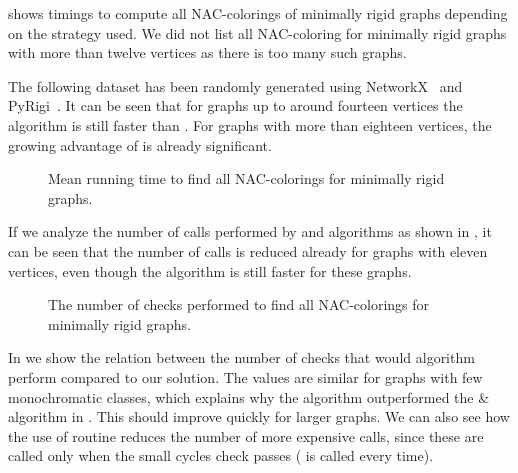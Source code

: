 shows timings to compute all NAC-colorings of minimally rigid graphs
depending on the strategy used.
We did not list all NAC-coloring for minimally rigid graphs with more than twelve vertices
as there is too many such graphs.

The following dataset has been randomly generated
using NetworkX~\cite{networkx} and PyRigi~\cite{pyrigi}.
%
It can be seen that for graphs up to around fourteen vertices the \NaiveCycles{} algorithm
is still faster than \Subgraphs{}.
For graphs with more than eighteen vertices,
the growing advantage of \Subgraphs{} is already significant.

\begin{figure}[ht]
	\centering
	\scalebox{0.5}{}
	\caption[Running time for minimally rigid graphs.]{
		Mean running time to find all NAC-colorings for minimally rigid graphs.}%
	\label{fig:graph_time_minimally_rigid}
\end{figure}%

If we analyze the number of \IsNACColoring{} calls performed by \NaiveCycles{} and \Subgraphs{} algorithms
as shown in ,
it can be seen that the number of \IsNACColoring{} calls is reduced already for graphs
with eleven vertices,
even though the \NaiveCycles{} algorithm is still faster for these graphs.

\begin{figure}[ht]
	\centering
	\scalebox{0.5}{}
	\caption[Checks performed for minimally rigid graphs.]{
		The number of checks performed to find all NAC-colorings for minimally rigid graphs.}%
	\label{fig:graph_count_minimally_rigid}
\end{figure}%

In 
we show the relation between the number of \IsNACColoring{} checks that
would \Naive{} algorithm perform compared to our solution.
The values are similar for graphs with few monochromatic classes,
which explains why the \NaiveCycles{} algorithm outperformed
the \NeighborsDegree{}\&\MergeLinear{} algorithm in . This should improve quickly for larger graphs.
We can also see how the use of \CycleMask{} routine
reduces the number of more expensive \IsNACColoring{} calls,
since these are called only when the small cycles check \CycleMask{} passes
(\CycleMask{} is called every time).

